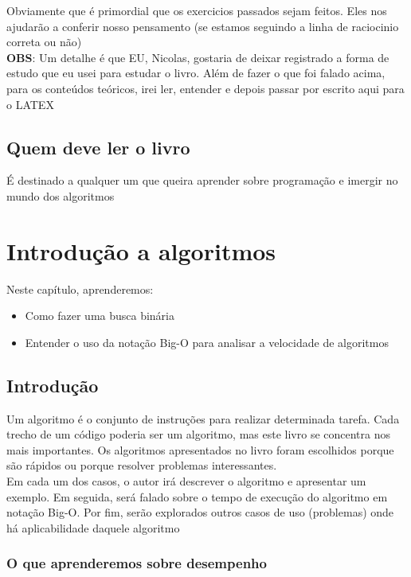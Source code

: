 \documentclass{report}
\begin{document}
	Obviamente que é primordial que os exercicios passados sejam feitos. Eles nos ajudarão a conferir nosso pensamento (se estamos seguindo a linha de raciocinio correta ou não)\\
	
	\textbf{OBS}: Um detalhe é que EU, Nicolas, gostaria de deixar registrado a forma de estudo que eu usei para estudar o livro. Além de fazer o que foi falado acima, para os conteúdos teóricos, irei ler, entender e depois passar por escrito aqui para o LATEX
	
	\section{Quem deve ler o livro}
	
	É destinado a qualquer um que queira aprender sobre programação e imergir no mundo dos algoritmos
	
	\chapter{Introdução a algoritmos}
	
	Neste capítulo, aprenderemos:
	
	\begin{itemize}
		\item Como fazer uma busca binária
		\item Entender o uso da notação Big-O para analisar a velocidade de algoritmos 
	\end{itemize}
	
	\section{Introdução}
	
	Um algoritmo é o conjunto de instruções para realizar determinada tarefa. Cada trecho de um código poderia ser um algoritmo, mas este livro se concentra nos mais importantes. Os algoritmos apresentados no livro foram escolhidos porque são rápidos ou porque resolver problemas interessantes. \\
	
	Em cada um dos casos, o autor irá descrever o algoritmo e apresentar um exemplo. Em seguida, será falado sobre o tempo de execução do algoritmo em notação Big-O. Por fim, serão explorados outros casos de uso (problemas) onde há aplicabilidade daquele algoritmo
	
	\subsection{O que aprenderemos sobre desempenho}
	
\end{document}
